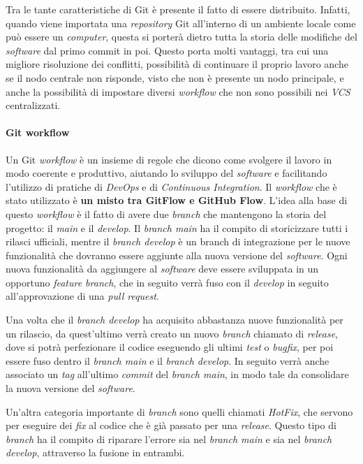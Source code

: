 Tra le tante caratteristiche di Git è presente il fatto di essere distribuito. Infatti, quando viene importata una \textit{repository} Git all'interno di un ambiente locale come può essere un \textit{computer}, questa si porterà dietro tutta la storia delle modifiche del \textit{software} dal primo commit in poi. Questo porta molti vantaggi, tra cui una migliore risoluzione dei conflitti, possibilità di continuare il proprio lavoro anche se il nodo centrale non risponde, visto che non è presente un nodo principale, e anche la possibilità di impostare diversi \textit{workflow} che non sono possibili nei \textit{VCS} centralizzati. 

\paragraph{Git workflow}
Un Git \textit{workflow} è un insieme di regole che dicono come svolgere il lavoro in modo coerente e produttivo,  aiutando lo sviluppo del \textit{software} e facilitando l'utilizzo di pratiche di \textit{DevOps} e di \textit{Continuous Integration}. Il \textit{workflow} che è stato utilizzato è \textbf{un misto tra GitFlow e GitHub Flow}.
L'idea alla base di questo \textit{workflow} è il fatto di avere due \textit{branch} che mantengono la storia del progetto: il \textit{main} e il \textit{develop}. Il \textit{branch main} ha il compito di storicizzare tutti i rilasci ufficiali, mentre il \textit{branch develop} è un branch di integrazione per le nuove funzionalità che dovranno essere aggiunte alla nuova versione del \textit{software}. Ogni nuova funzionalità da aggiungere al \textit{software} deve essere sviluppata in un opportuno \textit{feature branch}, che in seguito verrà fuso con il \textit{develop} in seguito all'approvazione di una \textit{pull request}. 

Una volta che il \textit{branch develop} ha acquisito abbastanza nuove funzionalità per un rilascio, da quest'ultimo verrà creato un nuovo \textit{branch} chiamato di \textit{release}, dove si potrà perfezionare il codice eseguendo gli ultimi \textit{test} o \textit{bugfix}, per poi essere fuso dentro il \textit{branch main} e il \textit{branch develop}. In seguito verrà anche associato un \textit{tag} all'ultimo \textit{commit} del \textit{branch main}, in modo tale da consolidare la nuova versione del \textit{software}.

Un'altra categoria importante di \textit{branch} sono quelli chiamati \textit{HotFix}, che servono per eseguire dei \textit{fix} al codice che è già passato per una \textit{release}. Questo tipo di \textit{branch} ha il compito di riparare l'errore sia nel \textit{branch main} e sia nel \textit{branch develop}, attraverso la fusione in entrambi. \\

